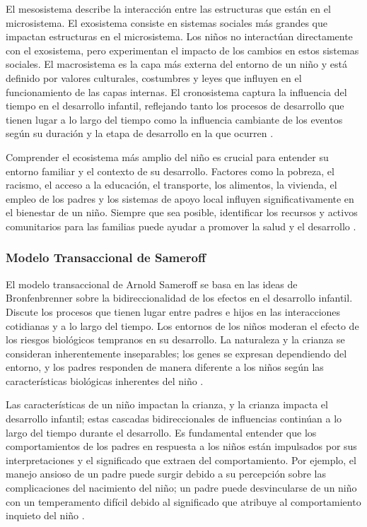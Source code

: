 El mesosistema describe la interacción entre las estructuras que están en el
microsistema. El exosistema consiste en sistemas sociales más grandes que
impactan estructuras en el microsistema. Los niños no interactúan directamente
con el exosistema, pero experimentan el impacto de los cambios en estos sistemas
sociales. El macrosistema es la capa más externa del entorno de un niño y está
definido por valores culturales, costumbres y leyes que influyen en el
funcionamiento de las capas internas. El cronosistema captura la influencia del
tiempo en el desarrollo infantil, reflejando tanto los procesos de desarrollo
que tienen lugar a lo largo del tiempo como la influencia cambiante de los
eventos según su duración y la etapa de desarrollo en la que ocurren
\cite{Feldman3}.

Comprender el ecosistema más amplio del niño es crucial para entender su 
entorno familiar y el contexto de su desarrollo. Factores como la pobreza, el 
racismo, el acceso a la educación, el transporte, los alimentos, la vivienda,
el empleo de los padres y los sistemas de apoyo local influyen
significativamente en el bienestar de un niño. Siempre que sea posible, 
identificar los recursos y activos comunitarios para las familias puede ayudar 
a promover la salud y el desarrollo \cite{Nelson19}.

\subsubsection{Modelo Transaccional de Sameroff}
El modelo transaccional de Arnold Sameroff se basa en las ideas de
Bronfenbrenner sobre la bidireccionalidad de los efectos en el desarrollo
infantil. Discute los procesos que tienen lugar entre padres e hijos en las
interacciones cotidianas y a lo largo del tiempo. Los entornos de los niños
moderan el efecto de los riesgos biológicos tempranos en su desarrollo. La
naturaleza y la crianza se consideran inherentemente inseparables; los genes se
expresan dependiendo del entorno, y los padres responden de manera diferente a
los niños según las características biológicas inherentes del niño
\cite{Feldman3}.

Las características de un niño impactan la crianza, y la crianza impacta el
desarrollo infantil; estas cascadas bidireccionales de influencias continúan a
lo largo del tiempo durante el desarrollo. Es fundamental entender que los
comportamientos de los padres en respuesta a los niños están impulsados por
sus interpretaciones y el significado que extraen del comportamiento. Por
ejemplo, el manejo ansioso de un padre puede surgir debido a su percepción
sobre las complicaciones del nacimiento del niño; un padre puede desvincularse
de un niño con un temperamento difícil debido al significado que atribuye al
comportamiento inquieto del niño \cite{Sameroff2009}.

